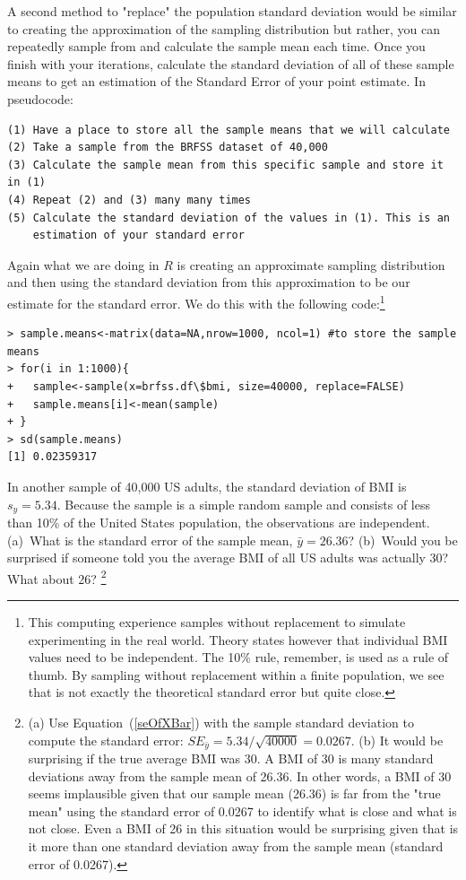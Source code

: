 A second method to "replace" the population standard deviation would be similar to creating the approximation of the sampling distribution but rather, you can repeatedly sample from  and calculate the sample mean each time. Once you finish with your iterations, calculate the standard deviation of all of these sample means to get an estimation of the Standard Error of your point estimate. In pseudocode: 
\begin{verbatim}
(1) Have a place to store all the sample means that we will calculate
(2) Take a sample from the BRFSS dataset of 40,000
(3) Calculate the sample mean from this specific sample and store it in (1)
(4) Repeat (2) and (3) many many times 
(5) Calculate the standard deviation of the values in (1). This is an 
	estimation of your standard error
\end{verbatim}

Again what we are doing in $R$ is creating an approximate sampling distribution and then using the standard deviation from this approximation to be our estimate for the standard error. We do this with the following code:\footnote{This computing experience samples without replacement to simulate experimenting in the real world. Theory states however that individual BMI values need to be independent. The 10\% rule, remember, is used as a rule of thumb. By sampling without replacement within a finite population, we see that  is not exactly the theoretical standard error but quite close.}
\begin{verbatim}
> sample.means<-matrix(data=NA,nrow=1000, ncol=1) #to store the sample means
> for(i in 1:1000){
+   sample<-sample(x=brfss.df\$bmi, size=40000, replace=FALSE)
+   sample.means[i]<-mean(sample)
+ }
> sd(sample.means)
[1] 0.02359317 
\end{verbatim}


\begin{exercise}
In another sample of 40,000 US adults, the standard deviation of BMI is $s_y = 5.34$. Because the sample is a simple random sample and consists of less than 10\% of the United States population, the observations are independent. (a)~What is the standard error of the sample mean, $\bar{y}=26.36$? (b)~Would you be surprised if someone told you the average BMI of all US adults was actually 30? What about 26? \footnote{(a) Use Equation~(\ref{seOfXBar}) with the sample standard deviation to compute the standard error: $SE_{\bar{y}} = 5.34/\sqrt{40000} =  0.0267$. (b) It would be surprising if the true average BMI was 30. A BMI of 30 is many standard deviations away from the sample mean of 26.36. In other words, a BMI of 30 seems implausible given that our sample mean (26.36) is far from the "true mean" using the standard error of 0.0267 to identify what is close and what is not close. Even a BMI of 26 in this situation would be surprising given that is it more than one standard deviation away from the sample mean (standard error of 0.0267).}
\end{exercise}


